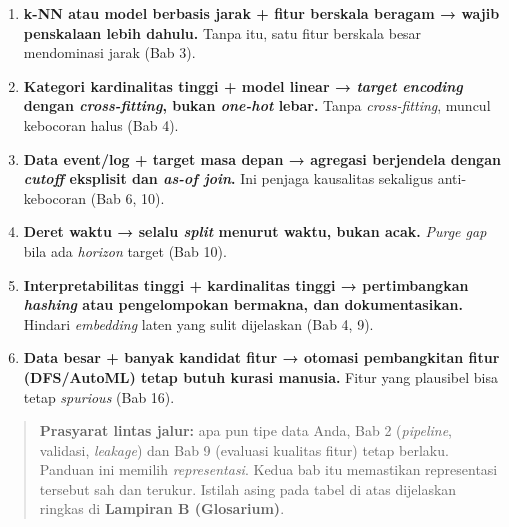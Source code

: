 \begin{enumerate}
\def\labelenumi{\arabic{enumi}.}
\tightlist
\item
  \textbf{k-NN atau model berbasis jarak + fitur berskala beragam → wajib penskalaan
  lebih dahulu.} Tanpa itu, satu fitur berskala besar mendominasi jarak (Bab 3).
\item
  \textbf{Kategori kardinalitas tinggi + model linear → \emph{target encoding} dengan
  \emph{cross-fitting}, bukan \emph{one-hot} lebar.} Tanpa \emph{cross-fitting}, muncul
  kebocoran halus (Bab 4).
\item
  \textbf{Data event/log + target masa depan → agregasi berjendela dengan \emph{cutoff}
  eksplisit dan \emph{as-of join}.} Ini penjaga kausalitas sekaligus anti-kebocoran
  (Bab 6, 10).
\item
  \textbf{Deret waktu → selalu \emph{split} menurut waktu, bukan acak.} \emph{Purge gap} bila
  ada \emph{horizon} target (Bab 10).
\item
  \textbf{Interpretabilitas tinggi + kardinalitas tinggi → pertimbangkan \emph{hashing}
  atau pengelompokan bermakna, dan dokumentasikan.} Hindari \emph{embedding} laten
  yang sulit dijelaskan (Bab 4, 9).
\item
  \textbf{Data besar + banyak kandidat fitur → otomasi pembangkitan fitur (DFS/AutoML)
  tetap butuh kurasi manusia.} Fitur yang plausibel bisa tetap \emph{spurious}
  (Bab 16).
\end{enumerate}

\begin{quote}
\textbf{Prasyarat lintas jalur:} apa pun tipe data Anda, Bab 2 (\emph{pipeline},
validasi, \emph{leakage}) dan Bab 9 (evaluasi kualitas fitur) tetap berlaku.
Panduan ini memilih \emph{representasi}. Kedua bab itu memastikan representasi tersebut sah dan terukur. Istilah asing pada tabel di atas dijelaskan ringkas di
\textbf{Lampiran B (Glosarium)}.
\end{quote}

